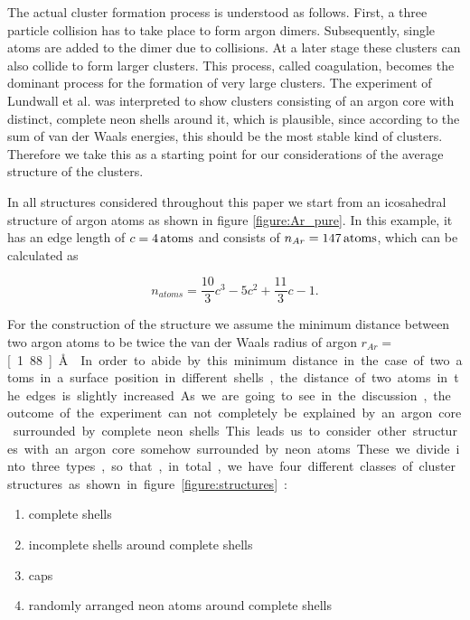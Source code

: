 The actual cluster formation process is understood as follows. First, a three particle
collision has to take place to form argon dimers. Subsequently, single atoms are added to the dimer 
due to collisions. At a later stage these clusters can also collide to form larger clusters. This process,
called coagulation, becomes the dominant process for the formation of very large clusters. 
The experiment of Lundwall et al. \cite{Lundwall07} was interpreted to
show clusters consisting of an argon core with distinct, complete neon
shells around it, which is plausible, since according to the sum of van der Waals
energies, this should be the most stable kind of clusters.
Therefore we take this as a starting point for our considerations of the
average structure of the clusters.

In all structures considered throughout this paper we start from an icosahedral
structure of argon atoms as shown in figure \ref{figure:Ar_pure}.
In this example, it has an edge length
of $c=\unit[4]{atoms}$ and consists of $n_{Ar}=\unit[147]{atoms}$, which can be
calculated as \cite{Martin96}

\begin{equation}
  n_{atoms} = \frac{10}{3} c^3 - 5 c^2 + \frac{11}{3} c -1 .
\end{equation}

For the construction of the structure we assume the minimum
distance between two argon
atoms to be twice the van der Waals
radius of argon $r_{Ar}=$ \unit[1.88]{\AA} \cite{Bondi64}. In order to abide by this
minimum distance in the case of two atoms in a surface position in different
shells, the distance of two atoms in the edges is slightly increased.

As we are going to see in the discussion, the outcome of the experiment
can not completely be explained by an argon core surrounded by complete neon shells.
This leads us to consider other structures with an argon core somehow surrounded
by neon atoms. These we divide into three types, so that, in total, we have four
different classes of cluster structures as shown in figure \ref{figure:structures}:

\begin{enumerate}
 \item complete shells
 \item incomplete shells around complete shells
 \item caps
 \item randomly arranged neon atoms around complete shells
\end{enumerate}

